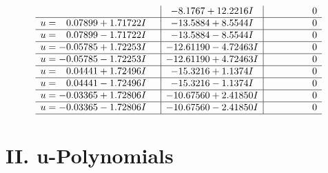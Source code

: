 \documentclass[1p]{elsarticle_modified}
\theoremstyle{definition}
\begin{document}
$$\begin{array}{c|c|c}
 & -8.1767 + 12.2216 I & \phantom{-0.000000 } 0 \\ \hline\begin{aligned}
u &= \phantom{-}0.07899 + 1.71722 I\end{aligned}
 & -13.5884 + 8.5544 I & \phantom{-0.000000 } 0 \\ \hline\begin{aligned}
u &= \phantom{-}0.07899 - 1.71722 I\end{aligned}
 & -13.5884 - 8.5544 I & \phantom{-0.000000 } 0 \\ \hline\begin{aligned}
u &= -0.05785 + 1.72253 I\end{aligned}
 & -12.61190 - 4.72463 I & \phantom{-0.000000 } 0 \\ \hline\begin{aligned}
u &= -0.05785 - 1.72253 I\end{aligned}
 & -12.61190 + 4.72463 I & \phantom{-0.000000 } 0 \\ \hline\begin{aligned}
u &= \phantom{-}0.04441 + 1.72496 I\end{aligned}
 & -15.3216 + 1.1374 I & \phantom{-0.000000 } 0 \\ \hline\begin{aligned}
u &= \phantom{-}0.04441 - 1.72496 I\end{aligned}
 & -15.3216 - 1.1374 I & \phantom{-0.000000 } 0 \\ \hline\begin{aligned}
u &= -0.03365 + 1.72806 I\end{aligned}
 & -10.67560 + 2.41850 I & \phantom{-0.000000 } 0 \\ \hline\begin{aligned}
u &= -0.03365 - 1.72806 I\end{aligned}
 & -10.67560 - 2.41850 I & \phantom{-0.000000 } 0\\
 \hline 
 \end{array}$$\newpage
\newpage\renewcommand{\arraystretch}{1}
\centering \section*{ II. u-Polynomials}
\end{document}
